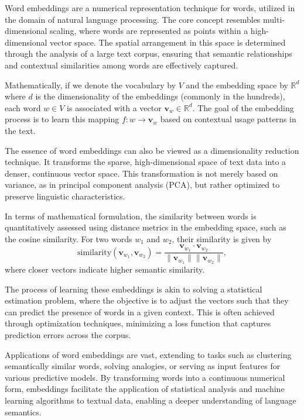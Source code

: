 \documentclass{article}
\begin{document}
Word embeddings are a numerical representation technique for words, utilized in the domain of natural language processing. The core concept resembles multi-dimensional scaling, where words are represented as points within a high-dimensional vector space. The spatial arrangement in this space is determined through the analysis of a large text corpus, ensuring that semantic relationships and contextual similarities among words are effectively captured.

Mathematically, if we denote the vocabulary by \(V\) and the embedding space by \(\mathbb{R}^d\) where \(d\) is the dimensionality of the embeddings (commonly in the hundreds), each word \(w \in V\) is associated with a vector \(\mathbf{v}_w \in \mathbb{R}^d\). The goal of the embedding process is to learn this mapping \(f: w \rightarrow \mathbf{v}_w\) based on contextual usage patterns in the text.

The essence of word embeddings can also be viewed as a dimensionality reduction technique. It transforms the sparse, high-dimensional space of text data into a denser, continuous vector space. This transformation is not merely based on variance, as in principal component analysis (PCA), but rather optimized to preserve linguistic characteristics.

In terms of mathematical formulation, the similarity between words is quantitatively assessed using distance metrics in the embedding space, such as the cosine similarity. For two words \(w_1\) and \(w_2\), their similarity is given by $$ \text{similarity}(\mathbf{v}_{w_1}, \mathbf{v}_{w_2}) = \frac{\mathbf{v}_{w_1} \cdot \mathbf{v}_{w_2}}{\|\mathbf{v}_{w_1}\| \|\mathbf{v}_{w_2}\|}, $$ where closer vectors indicate higher semantic similarity.

The process of learning these embeddings is akin to solving a statistical estimation problem, where the objective is to adjust the vectors such that they can predict the presence of words in a given context. This is often achieved through optimization techniques, minimizing a loss function that captures prediction errors across the corpus.

Applications of word embeddings are vast, extending to tasks such as clustering semantically similar words, solving analogies, or serving as input features for various predictive models. By transforming words into a continuous numerical form, embeddings facilitate the application of statistical analysis and machine learning algorithms to textual data, enabling a deeper understanding of language semantics.
\end{document}
